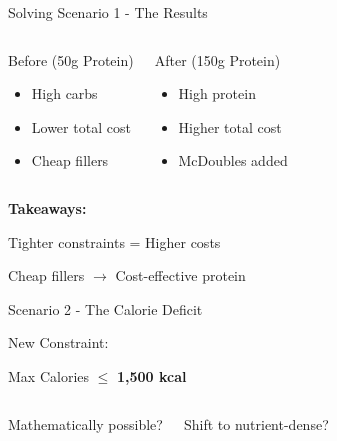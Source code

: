 \documentclass{beamer}
\begin{document}
\begin{frame}{Solving Scenario 1 - The Results}
  \begin{columns}
    \begin{block}{Before (50g Protein)}
      \begin{itemize}
        \item High carbs
        \item Lower total cost
        \item Cheap fillers
      \end{itemize}
    \end{block}
    
    \begin{block}{After (150g Protein)}
      \begin{itemize}
        \item High protein
        \item Higher total cost
        \item McDoubles added
      \end{itemize}
    \end{block}
  \end{columns}
  
  \vspace{1cm}
  \centering
  \textbf{Takeaways:}
  
  Tighter constraints = Higher costs
  
  Cheap fillers $\rightarrow$ Cost-effective protein
\end{frame}

\begin{frame}{Scenario 2 - The Calorie Deficit}
  \begin{center}
    \Large
    New Constraint:
    
    \vspace{0.5cm}
    Max Calories $\le$ \textbf{1,500 kcal}
    \vspace{1cm}
    
    \normalsize
    \begin{columns}
      \centering
      Mathematically possible?
      
      \centering
      Shift to nutrient-dense?
    \end{columns}
  \end{center}
\end{frame}
\end{document}
